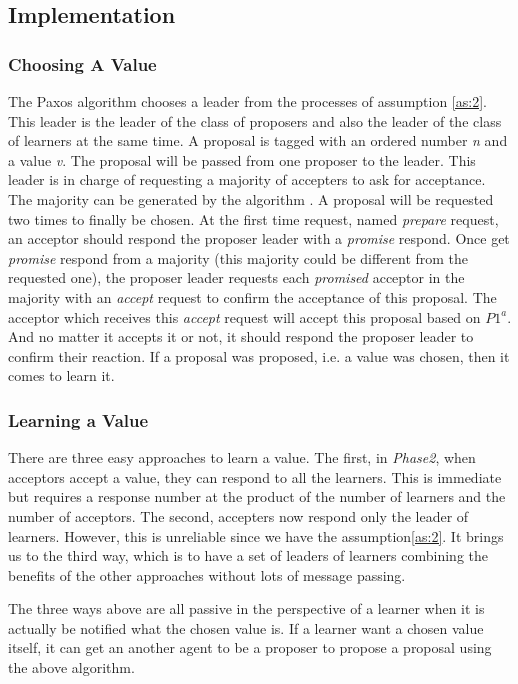 \documentclass[12pt, a4paper]{article}
\begin{document}
\subsection{Implementation}

\subsubsection{Choosing A Value} \label{Choosing}
The Paxos algorithm \cite{lamport1998part} chooses a leader from the processes of assumption \ref{as:2}. This leader is the leader of the class of proposers and also the leader of the class of learners at the same time. A proposal is tagged with an ordered number \textit{n} and a value \textit{v}. The proposal will be passed from one proposer to the leader. This leader is in charge of requesting a majority of accepters to ask for acceptance. The majority can be generated by the algorithm \cite{keidar2001cost}. A proposal will be requested two times to finally be chosen. At the first time request, named \textit{prepare} request, an acceptor should respond the proposer leader with a \textit{promise} respond. Once get \textit{promise} respond from a majority (this majority could be different from the requested one), the proposer leader requests each \textit{promised} acceptor in the majority with an \textit{accept} request to confirm the acceptance of this proposal. The acceptor which receives this \textit{accept} request will accept this proposal based on $P1^a$. And no matter it accepts it or not, it should respond the proposer leader to confirm their reaction. If a proposal was proposed, i.e. a value was chosen, then it comes to learn it.

\subsubsection{Learning a Value}
There are three easy approaches to learn a value. The first, in \textit{Phase2}, when acceptors accept a value, they can respond to all the learners. This is immediate but requires a response number at the product of the number of learners and the number of acceptors. The second, accepters now respond only the leader of learners. However, this is unreliable since we have the assumption\ref{as:2}. It brings us to the third way, which is to have a set of leaders of learners combining the benefits of the other approaches without lots of message passing.

The three ways above are all passive in the perspective of a learner when it is actually be notified what the chosen value is. If a learner want a chosen value itself, it can get an another agent to be  a proposer to propose a proposal using the above algorithm.
\end{document}
